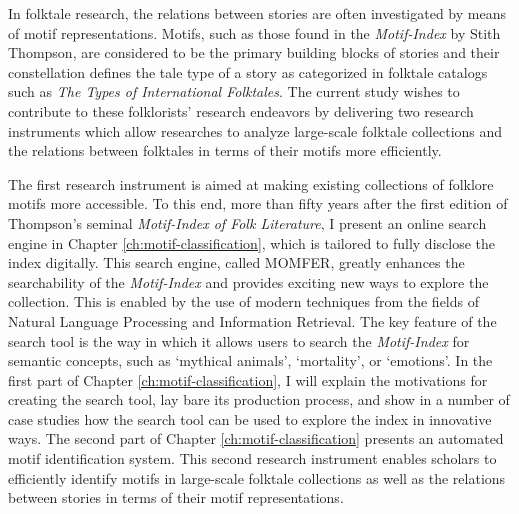 In folktale research, the relations between stories are often investigated by means of motif representations. Motifs, such as those found in the \emph{Motif-Index} by Stith Thompson\autocite{thompson:1955}, are considered to be the primary building blocks of stories and their constellation defines the tale type of a story as categorized in folktale catalogs such as \emph{The Types of International Folktales}\autocite{uther:2004}. The current study wishes to contribute to these folklorists' research endeavors by delivering two research instruments which allow researches to analyze large-scale folktale collections and the relations between folktales in terms of their motifs more efficiently. 

The first research instrument is aimed at making existing collections of folklore motifs more accessible. To this end, more than fifty years after the first edition of Thompson's seminal \emph{Motif-Index of Folk Literature}, I present an online search engine in Chapter \ref{ch:motif-classification}, which is tailored to fully disclose the index digitally. This search engine, called MOMFER, greatly enhances the searchability of the \emph{Motif-Index} and provides exciting new ways to explore the collection. This is enabled by the use of modern techniques from the fields of Natural Language Processing and Information Retrieval. The key feature of the search tool is the way in which it allows users to search the \emph{Motif-Index} for semantic concepts, such as `mythical animals', `mortality', or `emotions'. In the first part of Chapter \ref{ch:motif-classification}, I will explain the motivations for creating the search tool, lay bare its production process, and show in a number of case studies how the search tool can be used to explore the index in innovative ways. The second part of Chapter \ref{ch:motif-classification} presents an automated motif identification system. This second research instrument enables scholars to efficiently identify motifs in large-scale folktale collections as well as the relations between stories in terms of their motif representations.

